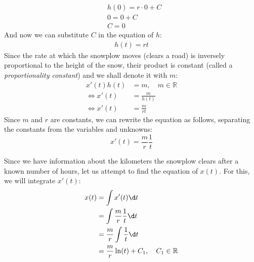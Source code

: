 \documentclass[a4paper,12pt]{article}
\begin{document}
    \begin{align*}
        &h(0) = r \cdot 0 + C \\
        &0 = 0 + C \\
        &\boxed{C = 0}
    \end{align*}
    And now we can substitute $C$ in the equation of $h$:
    \begin{align*}
        h(t) = rt 
    \end{align*}
    Since the rate at which the snowplow moves (clears a road) is inversely proportional to the height of the snow, their product is constant (called a \emph{proportionality constant}) and we shall denote it with $m$:
    \begin{align*}
        x'(t) h(t) &= m, \quad m \in \mathbb{R} \\
        \iff x'(t) &= \frac{m}{h(t)} \\
        \iff x'(t) &= \frac{m}{rt}
    \end{align*}
    Since $m$ and $r$ are constants, we can rewrite the equation as follows, separating the constants from the variables and unknowns:
    \begin{equation*}
        x'(t) = \frac{m}{r} \frac{1}{t}
    \end{equation*}


    Since we have information about the kilometers the snowplow clears after a known number of hours, let us attempt to find the equation of $x(t)$. For this, we will integrate $x'(t)$:
    \begin{align*}
        x(t) &= \int x'(t) \d t \\ 
        &= \int \frac{m}{r} \frac{1}{t} \d t \\
        &= \frac{m}{r} \int \frac{1}{t} \d t \\
        &= \frac{m}{r} \ln(t) + C_1, \quad C_1 \in \mathbb{R}
    \end{align*}
    
\end{document}
